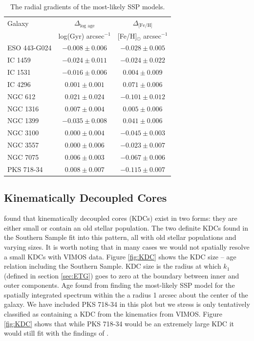 			\begin{table}
				\centering
				\caption{The radial gradients of the most-likely SSP models.}
				\label{tab:popGrad}
				\begin{tabular}{l c c}
					\hline
					\hline 
					Galaxy 	& $\Delta_\text{log age}$ & $\Delta_\text{[Fe/H]}$ \\ 
						& log(Gyr) arcsec$^{-1}$ & [Fe/H]$_\odot$ arcsec$^{-1}$ \\
					\hline
					ESO 443-G024 & $-0.008 \pm 0.006$ & $-0.028 \pm 0.005$ \\
					IC 1459 	& $-0.024 \pm 0.011$ & $-0.024 \pm 0.022$ \\
					IC 1531 	& $-0.016 \pm 0.006$ & $0.004 \pm 0.009$ \\
					IC 4296		& $0.001 \pm 0.001$ & $0.071 \pm 0.006$ \\
					NGC 612 	& $0.021 \pm 0.024$ & $-0.101 \pm 0.012$ \\
					NGC 1316 	& $0.007 \pm 0.004$ & $0.005 \pm 0.006$ \\
					NGC 1399 	& $-0.035 \pm 0.008$ & $0.041 \pm 0.006$ \\
					NGC 3100 	& $0.000 \pm 0.004$ & $-0.045 \pm 0.003$ \\
					NGC 3557 	& $0.000 \pm 0.006$ & $-0.023 \pm 0.007$ \\
					NGC 7075 	& $0.006 \pm 0.003$ & $-0.067 \pm 0.006$ \\
					PKS 718-34  & $0.008 \pm 0.007$ & $-0.115 \pm 0.007$ \\
				\end{tabular}
			\end{table}



	\subsection{Kinematically Decoupled Cores}
		\label{subsec:popKDC}

		\citet{Kuntschner2010} found that kinematically decoupled cores (KDCs) exist in two forms: they are either small or contain an old stellar population. The two definite KDCs found in the Southern Sample fit into this pattern, all with old stellar populations and varying sizes. It is worth noting that in many cases we would not spatially resolve a small KDCs with VIMOS data. Figure \ref{fig:KDC} shows the KDC size -- age relation including the Southern Sample. KDC size is the radius at which $k_1$ (defined in section \ref{sec:ETG}) goes to zero at the boundary between inner and outer components. Age found from finding the most-likely SSP model for the spatially integrated spectrum within the a radius 1 arcsec about the center of the galaxy. We have included PKS 718-34 in this plot but we stress is only tentatively classified as containing a KDC from the kinematics from VIMOS. Figure \ref{fig:KDC} shows that while PKS 718-34 would be an extremely large KDC it would still fit with the findings of \citet{Kuntschner2010}.

